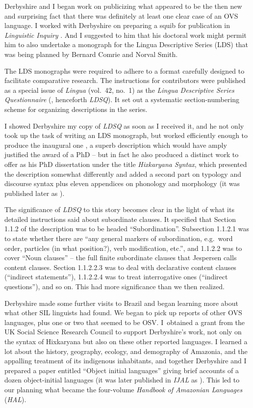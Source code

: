 \documentclass[output=paper,colorlinks,citecolor=brown
]{langscibook}
\begin{document}
Derbyshire and I began work on publicizing what appeared to be the then
new and surprising fact that there was definitely at least one clear
case of an OVS language. I worked with Derbyshire on preparing a squib
for publication in \textit{Linguistic Inquiry} \citep{Derbyshire77}.
And I suggested to him that his doctoral work might permit him to
also undertake a monograph for the Lingua Descriptive Series (LDS)
that was being planned by Bernard Comrie and Norval Smith.

The LDS monographs were required to adhere to a format carefully designed
to facilitate comparative research. The instructions for contributors
were published as a special issue of \textit{Lingua} (vol.~42, no.~1)
as the \textit{Lingua Descriptive Series Questionnaire}
(\citealt{ComrSmit77}, henceforth \textit{LDSQ}). It set out a systematic
section-numbering scheme for organizing descriptions in the series.

I showed Derbyshire my copy of \textit{LDSQ} as soon as I received it, and
he not only took up the task of writing an LDS monograph, but worked
efficiently enough to produce the inaugural one \citep{Derbyshire79},
a superb description which would have amply justified the award of a
PhD -- but in fact he also produced a distinct work to offer as his
PhD dissertation under the title \textit{Hixkaryana Syntax}, which
presented the description somewhat differently and added a second
part on typology and discourse syntax plus eleven appendices on
phonology and morphology (it was published later as
\citealt{Derbyshire85}).

The significance of \textit{LDSQ} to this story becomes clear in
the light of what its detailed instructions said about subordinate
clauses. It specified that Section 1.1.2 of the description was to
be headed ``Subordination''. Subsection 1.1.2.1 was to state whether
there are ``any general markers of subordination, e.g.\ word order,
particles (in what position?), verb modification, etc.'', and 1.1.2.2
was to cover ``Noun clauses'' -- the full finite subordinate clauses
that Jespersen calls content clauses. Section 1.1.2.2.3 was to deal
with declarative content clauses (``indirect statements''), 1.1.2.2.4
was to treat interrogative ones (``indirect questions''), and so on.
This had more significance than we then realized.

Derbyshire made some further visits to Brazil and began learning more about
what other SIL linguists had found. We began to pick up reports of
other OVS languages, plus one or two that seemed to be OSV. I~obtained
a grant from the UK Social Science Research Council to support Derbyshire's
work, not only on the syntax of Hixkaryana but also on these other
reported languages. I learned a lot about the history, geography,
ecology, and demography of Amazonia, and the appalling
treatment of its indigenous inhabitants, and together
Derbyshire and I prepared a paper entitled ``Object initial languages'' giving
brief accounts of a dozen object-initial languages (it was later
published in \textit{IJAL} as \citealt{DerbPull81}). This led to our
planning what became the four-volume \textit{Handbook of Amazonian
Languages} (\textit{HAL}).
\end{document}
